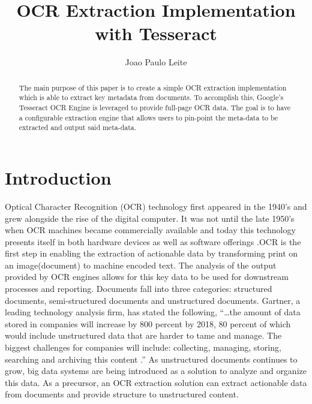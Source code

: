 
\title{OCR Extraction Implementation with Tesseract}


\author{Joao Paulo Leite}

\renewcommand{\shortauthors}{J. P. Leite}


\begin{abstract}

The main purpose of this paper is to create a simple OCR extraction
implementation which is able to extract key metadata from documents.
To accomplish this, Google's Tesseract OCR Engine is leveraged to provide
full-page OCR data. The goal is to have a configurable extraction engine 
that allows users to pin-point the meta-data to be extracted and
output said meta-data.

\end{abstract}



\maketitle

\section{Introduction}

Optical Character Recognition (OCR) technology first appeared in the 1940's
and grew alongside the rise of the digital computer. It was not until the late 
1950's when OCR machines became commercially available and today this 
technology presents itself in both hardware devices as well as software offerings
\cite{hid-sp18-414-www-eikvilocr}.OCR is the first step in enabling the extraction 
of actionable data by transforming print on an image(document) to machine encoded 
text. The analysis of the output provided by OCR engines allows for this key data to 
be used for downstream processes and reporting. Documents fall into three categories: 
structured documents, semi-structured documents and unstructured documents. Gartner, 
a leading technology analysis firm, has stated the following, “…the amount of data stored
in companies will increase by 800 percent by 2018, 80 percent of which would include 
unstructured data that are harder to tame and manage. The biggest challenges for companies
will include: collecting, managing, storing, searching and archiving this content
\cite{hid-sp18-414-www-ecmandbigdata}.” As unstructured documents 
continues to grow, big data systems are being introduced as a solution to analyze and 
organize this data. As a precursor, an OCR extraction solution can extract actionable
data from documents and provide structure to unstructured content. 

